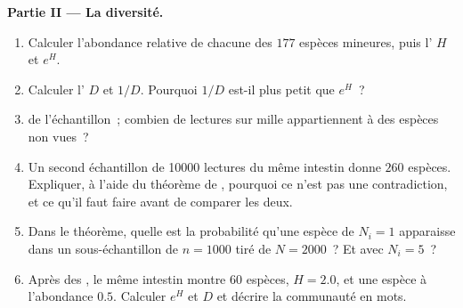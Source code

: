 \begin{problem}
\medskip
\noindent\textbf{Partie II --- La diversité.}
\begin{enumerate}[resume]
  \item Calculer l'abondance relative de chacune des $177$ espèces
        mineures, puis l' $H$ et $e^{H}$.
  \item Calculer l' $D$ et $1/D$. Pourquoi $1/D$ est-il
        plus petit que $e^{H}$~?
  \item {} de l'échantillon~; combien de lectures sur
        mille appartiennent à des espèces non vues~?
  \item Un second échantillon de \num{10000} lectures du même intestin
        donne $260$ espèces. Expliquer, à l'aide du théorème de
        , pourquoi ce n'est pas une contradiction, et ce
        qu'il faut faire avant de comparer les deux.
  \item Dans le théorème, quelle est la probabilité qu'une espèce de
        $N_{i} = 1$ apparaisse dans un sous-échantillon de $n = 1000$
        tiré de $N =
        2000$~? Et avec $N_{i} = 5$~?
  \item Après des , le même intestin montre $60$ espèces,
        $H = 2.0$, et une espèce à l'abondance $0.5$. Calculer $e^{H}$
        et $D$ et décrire la communauté en mots.
\end{enumerate}


\end{problem}

